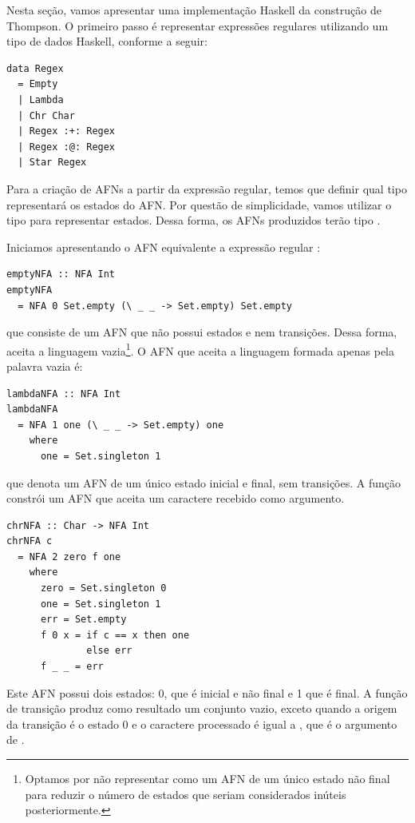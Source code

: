 Nesta seção, vamos apresentar uma implementação Haskell da construção
de Thompson. O primeiro passo é representar expressões regulares
utilizando um tipo de dados Haskell, conforme a seguir:

\begin{verbatim}
data Regex
  = Empty
  | Lambda
  | Chr Char
  | Regex :+: Regex
  | Regex :@: Regex
  | Star Regex
\end{verbatim}

Para a criação de AFNs a partir da expressão regular, temos que
definir qual tipo representará os estados do AFN. Por questão de
simplicidade, vamos utilizar o tipo 
para representar estados. Dessa forma, os AFNs produzidos terão tipo
.

Iniciamos apresentando o AFN equivalente a expressão regular
:

\begin{verbatim}
emptyNFA :: NFA Int
emptyNFA
  = NFA 0 Set.empty (\ _ _ -> Set.empty) Set.empty
\end{verbatim}

que consiste de um AFN que não possui estados e nem transições. Dessa
forma, aceita a linguagem vazia\footnote{Optamos por não representar
  como um AFN de um único estado não final para reduzir o número de
estados que seriam considerados inúteis posteriormente.}. O AFN que
aceita a linguagem formada apenas pela palavra vazia é:

\begin{verbatim}
lambdaNFA :: NFA Int
lambdaNFA
  = NFA 1 one (\ _ _ -> Set.empty) one
    where
      one = Set.singleton 1
\end{verbatim}

que denota um AFN de um único estado inicial e final, sem transições.
A função  constrói um AFN que aceita
um caractere recebido como argumento.

\begin{verbatim}
chrNFA :: Char -> NFA Int
chrNFA c
  = NFA 2 zero f one
    where
      zero = Set.singleton 0
      one = Set.singleton 1
      err = Set.empty
      f 0 x = if c == x then one
              else err
      f _ _ = err
\end{verbatim}

Este AFN possui dois estados: 0, que é inicial e não final e 1 que é
final. A função de transição produz como resultado um conjunto vazio,
exceto quando a origem da transição é o estado 0 e o caractere
processado é igual a , que é o argumento
de .

